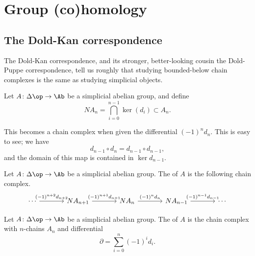 \documentclass[main.tex]{subfiles}
\begin{document}
\section{Group (co)homology}
\label{sec:group_co_homology}

\subsection{The Dold-Kan correspondence}
\label{ssc:the_dold_kan_correspondence}

The Dold-Kan correspondence, and its stronger, better-looking cousin the Dold-Puppe correspondence, tell us roughly that studying bounded-below chain complexes is the same as studying simplicial objects.

Let $A\colon \Delta\op \to \Ab$ be a simplicial abelian group, and define
\begin{equation*}
  NA_{n} = \bigcap_{i = 0}^{n-1} \ker(d_{i}) \subset A_{n}.
\end{equation*}

This becomes a chain complex when given the differential $(-1)^{n}d_{n}$. This is easy to see; we have
\begin{equation*}
  d_{n-1} \circ d_{n} = d_{n-1} \circ d_{n-1},
\end{equation*}
and the domain of this map is contained in $\ker d_{n-1}$.

\begin{definition}
  \label{def:normalized_chain_complex}
  Let $A\colon \Delta\op \to \Ab$ be a simplicial abelian group. The  of $A$ is the following chain complex.
  \begin{equation*}
    \begin{tikzcd}[column sep=large]
      \cdots
      \arrow[r, "(-1)^{n+2}d_{n+2}"]
      & N A_{n+1}
      \arrow[r, "(-1)^{n+1}d_{n+1}"]
      & N A_{n}
      \arrow[r, "(-1)^{n}d_{n}"]
      & N A_{n-1}
      \arrow[r, "(-1)^{n-1}d_{n-1}"]
      & \cdots
    \end{tikzcd}
  \end{equation*}
\end{definition}

\begin{definition}
  \label{def:moore_complex}
  Let $A\colon \Delta\op \to \Ab$ be a simplicial abelian group. The  of $A$ is the chain complex with $n$-chains $A_{n}$ and differential
  \begin{equation*}
    \partial = \sum_{i = 0}^{n} (-1)^{i} d_{i}.
  \end{equation*}
\end{definition}
\end{document}
